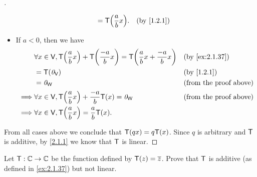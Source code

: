 \begin{proof}[]
\begin{itemize}
\begin{align*}
                                                & = \T\pa{\frac{a}{b} x}.               &  & \text{(by \cref{1.2.1})}
          \end{align*}
    \item If \(a < 0\), then we have
          \begin{align*}
                     & \forall x \in \V, \T\pa{\frac{a}{b} x} + \T\pa{\frac{-a}{b} x} = \T\pa{\frac{a}{b} x + \frac{-a}{b} x} &  & \text{(by \cref{ex:2.1.37})}  \\
                     & = \T(\zv_{\V})                                                                                         &  & \text{(by \cref{1.2.1})}      \\
                     & = \zv_{\W}                                                                                             &  & \text{(from the proof above)} \\
            \implies & \forall x \in \V, \T\pa{\frac{a}{b} x} + \frac{-a}{b} \T(x) = \zv_{\W}                                 &  & \text{(from the proof above)} \\
            \implies & \forall x \in \V, \T\pa{\frac{a}{b} x} = \frac{a}{b} \T(x).
          \end{align*}
  \end{itemize}
  From all cases above we conclude that \(\mathsf{T}(qx) = q \mathsf{T}(x)\).
  Since \(q\) is arbitrary and \(\mathsf{T}\) is additive, by \cref{2.1.1} we know that \(\mathsf{T}\) is linear.
\end{proof}

\begin{ex}\label{ex:2.1.38}
  Let \(\mathsf{T} : \mathbb{C} \to \mathbb{C}\) be the function defined by \(\mathsf{T}(z) = \overline{z}\).
  Prove that \(\mathsf{T}\) is additive (as defined in \cref{ex:2.1.37}) but not linear.
\end{ex}

